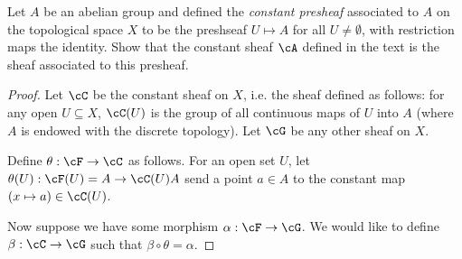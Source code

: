 \begin{problemset}
	\item Let $A$ be an abelian group and defined the \emph{constant presheaf} associated to $A$ on the topological space $X$ to be the preshseaf $U\mapsto A$ for all $U\neq \emptyset$, with restriction maps the identity. Show that the constant sheaf $\cA$ defined in the text is the sheaf associated to this presheaf.
	\begin{proof}
		Let $\cC$ be the constant sheaf on $X$, i.e. the sheaf defined as follows: for any open $U\subseteq X$, $\cC(U)$ is the group of all continuous maps of $U$ into $A$ (where $A$ is endowed with the discrete topology). Let $\cG$ be any other sheaf on $X$.

		Define $\theta:\cF\to \cC$ as follows. For an open set $U$, let $\theta(U):\cF(U) = A\to \cC(U)A$ send a point $a \in A$ to the constant map $(x \mapsto a)\in \cC(U)$.

		Now suppose we have some morphism $\alpha:\cF\to \cG$. We would like to define $\beta:\cC\to \cG$ such that $\beta\circ\theta = \alpha$.


\end{proof}
\end{problemset}
